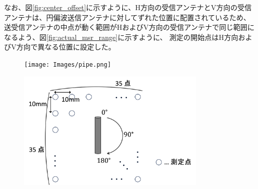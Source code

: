 \documentclass[11pt,a4paper,uplatex]{ujarticle}
\begin{document}
  なお、図\ref{fig:center_offset}に示すように、H方向の受信アンテナとV方向の受信アンテナは、円偏波送信アンテナに対してずれた位置に配置されているため、
  送受信アンテナの中点が動く範囲がHおよびV方向の受信アンテナで同じ範囲になるよう、図\ref{fig:actual_msr_range}に示すように、
  測定の開始点はH方向およびV方向で異なる位置に設定した。


  \begin{figure}[tbp]
    \begin{minipage}{0.4\textwidth}
      \centering
      \texttt{[image: Images/pipe.png]}
      \label{fig:pipe}
    \end{minipage}
    \begin{minipage}{0.6\textwidth}
      \centering
      \includegraphics[keepaspectratio, width=90mm]{Images/msr_cond.png}
      \label{fig:msr_cond}
    \end{minipage}
  \end{figure}
\end{document}
